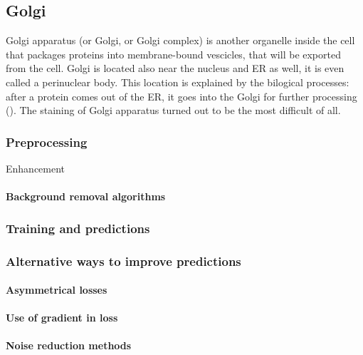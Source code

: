 \subsection{Golgi}
    Golgi apparatus (or Golgi, or Golgi complex) is another organelle inside the cell that packages proteins into membrane-bound vescicles, that will be exported from the cell. Golgi is located also near the nucleus and ER as well, it is even called a perinuclear body. This location is explained by the bilogical processes: after a protein comes out of the ER, it goes into the Golgi for further processing (\cite{golgi}). The staining of Golgi apparatus turned out to be the most difficult of all. 
    \subsubsection{Preprocessing}
        Enhancement
        
        \paragraph{Background removal algorithms}
            \label{par:background-removal}
            
    \subsubsection{Training and predictions}
        

    \subsubsection{Alternative ways to improve predictions}
        \paragraph{Asymmetrical losses}
            
        \paragraph{Use of gradient in loss}
        \paragraph{Noise reduction methods}
